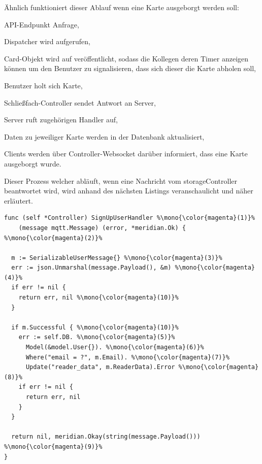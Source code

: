 \noindent
Ähnlich funktioniert dieser Ablauf wenn eine Karte ausgeborgt werden soll: 
\begin{description}
\item API-Endpunkt Anfrage, 
\item Dispatcher wird aufgerufen, 
\item Card-Objekt wird auf  veröffentlicht, sodass die Kollegen deren Timer anzeigen können um den Benutzer zu signalisieren, dass sich dieser die Karte abholen soll, 
\item Benutzer holt sich Karte, 
\item Schließfach-Controller sendet Antwort an Server, 
\item Server ruft zugehörigen Handler auf, 
\item Daten zu jeweiliger Karte werden in der Datenbank aktualisiert, 
\item Clients werden über Controller-Websocket  darüber informiert, dass eine Karte ausgeborgt wurde.     
\end{description}
Dieser Prozess welcher abläuft, wenn eine Nachricht vom \gls{storageController} beantwortet wird, wird anhand des nächsten Listings veranschaulicht und näher erläutert.  
\begin{lstlisting}[style=goMono, caption={\centering Handler, um dem System einen neuen Benutzer hinzuzufügen}, label={lst:impl:controller:ex2}]
func (self *Controller) SignUpUserHandler %\mono{\color{magenta}(1)}%
    (message mqtt.Message) (error, *meridian.Ok) { %\mono{\color{magenta}(2)}%

  m := SerializableUserMessage{} %\mono{\color{magenta}(3)}% 
  err := json.Unmarshal(message.Payload(), &m) %\mono{\color{magenta}(4)}% 
  if err != nil {
    return err, nil %\mono{\color{magenta}(10)}% 
  }

  if m.Successful { %\mono{\color{magenta}(10)}% 
    err := self.DB. %\mono{\color{magenta}(5)}% 
      Model(&model.User{}). %\mono{\color{magenta}(6)}% 
      Where("email = ?", m.Email). %\mono{\color{magenta}(7)}% 
      Update("reader_data", m.ReaderData).Error %\mono{\color{magenta}(8)}% 
    if err != nil {
      return err, nil
    }
  }

  return nil, meridian.Okay(string(message.Payload())) %\mono{\color{magenta}(9)}% 
}
\end{lstlisting}
